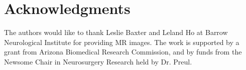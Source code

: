 \documentclass{aims}
\numberwithin{equation}{section}
\begin{document}

\section*{Acknowledgments}
The authors would like to thank Leslie Baxter and Leland Ho at Barrow
Neurological Institute for providing MR images. The work is supported
by a grant from Arizona Biomedical Research Commission, and by funds from the Newsome Chair in Neurosurgery Research held by Dr. Preul. \\


%
%
\end{document}
